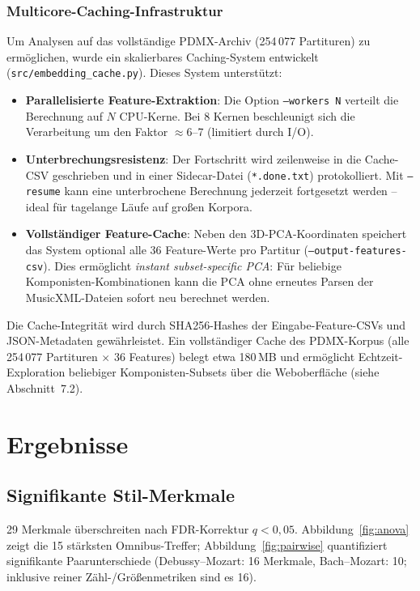\documentclass[12pt,a4paper]{article}
\theoremstyle{definition}
\begin{document}
\subsubsection{Multicore-Caching-Infrastruktur}
Um Analysen auf das vollständige PDMX-Archiv (254\,077 Partituren) zu ermöglichen, wurde ein skalierbares Caching-System entwickelt (\texttt{src/embedding\_cache.py}). Dieses System unterstützt:
\begin{itemize}
    \item \textbf{Parallelisierte Feature-Extraktion}: Die Option \texttt{--workers N} verteilt die Berechnung auf $N$ CPU-Kerne. Bei 8 Kernen beschleunigt sich die Verarbeitung um den Faktor $\approx$6--7 (limitiert durch I/O).
    \item \textbf{Unterbrechungsresistenz}: Der Fortschritt wird zeilenweise in die Cache-CSV geschrieben und in einer Sidecar-Datei (\texttt{*.done.txt}) protokolliert. Mit \texttt{--resume} kann eine unterbrochene Berechnung jederzeit fortgesetzt werden -- ideal für tagelange Läufe auf großen Korpora.
    \item \textbf{Vollständiger Feature-Cache}: Neben den 3D-PCA-Koordinaten speichert das System optional alle 36 Feature-Werte pro Partitur (\texttt{--output-features-csv}). Dies ermöglicht \textit{instant subset-specific PCA}: Für beliebige Komponisten-Kombinationen kann die PCA ohne erneutes Parsen der MusicXML-Dateien sofort neu berechnet werden.
\end{itemize}

\noindent Die Cache-Integrität wird durch SHA256-Hashes der Eingabe-Feature-CSVs und JSON-Metadaten gewährleistet. Ein vollständiger Cache des PDMX-Korpus (alle 254\,077 Partituren $\times$ 36 Features) belegt etwa 180\,MB und ermöglicht Echtzeit-Exploration beliebiger Komponisten-Subsets über die Weboberfläche (siehe Abschnitt~7.2).

\section{Ergebnisse}
\subsection{Signifikante Stil-Merkmale}
29 Merkmale überschreiten nach FDR-Korrektur \(q<0{,}05\). Abbildung~\ref{fig:anova} zeigt die 15 stärksten Omnibus-Treffer; Abbildung~\ref{fig:pairwise} quantifiziert signifikante Paarunterschiede (Debussy--Mozart: 16 Merkmale, Bach--Mozart: 10; inklusive reiner Zähl-/Größenmetriken sind es 16).
\end{document}
